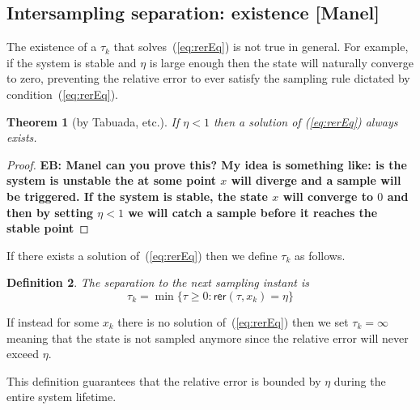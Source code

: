 \documentclass[12pt,draftcls,onecolumn]{IEEEtran} %
\newtheorem{lemma}{Lemma}
\newtheorem{theorem}{Theorem}
\newtheorem{definition}[theorem]{Definition}
\newcommand{\nE}[1]{\left\|#1\right\|_{\mathsf e}}
\newcommand{\nX}[1]{\left\|#1\right\|_{\mathsf x}}
\newcommand{\NN}{\mathbb{N}}
\begin{document}
\subsection{Intersampling separation: existence [Manel]}
\label{sec:tauKexists}

The existence of a $\tau_k$ that solves~(\ref{eq:rerEq}) is not true
in general. For example, if the system is stable and $\eta$ is large
enough then the state will naturally converge to zero, preventing the
relative error to ever satisfy the sampling rule dictated by
condition~(\ref{eq:rerEq}). 
\begin{theorem}[by Tabuada, etc.]
  If $\eta<1$ then a solution of (\ref{eq:rerEq}) always exists.
\end{theorem}
\begin{proof}
  \textbf{EB: Manel can you prove this? My idea is something like: is
    the system is unstable the at some point $x$ will diverge and a
    sample will be triggered. If the system is stable, the state $x$
    will converge to $0$ and then by setting $\eta<1$ we will catch a
    sample before it reaches the stable point}
\end{proof}

If there exists a solution of~(\ref{eq:rerEq}) then we define $\tau_k$
as follows.
\begin{definition}
  The separation to the next sampling instant is
  \begin{equation}
    \label{eq:nextActDef}
    \tau_k=\min\{\tau\geq 0: \mathsf{rer}(\tau,x_k) = \eta\}
  \end{equation}
\end{definition}
If instead for some $x_k$ there is no solution of~(\ref{eq:rerEq})
then we set $\tau_k=\infty$ meaning that the state is not sampled
anymore since the relative error will never exceed $\eta$.

This definition guarantees that the relative error is bounded by
$\eta$ during the entire system lifetime.
\end{document}
